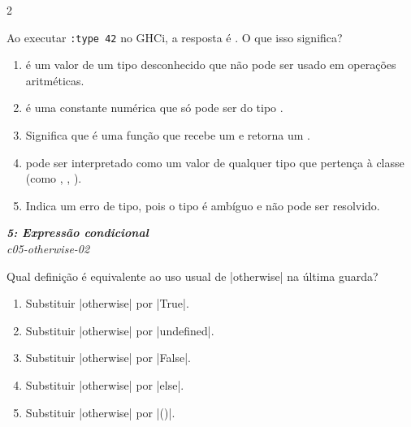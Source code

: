 \documentclass[a4paper,10pt,brazil]{article}
\begin{document}
\begin{multicols}{2}
\begin{flushright}
\end{flushright}
Ao executar \texttt{:type 42} no GHCi, a resposta é . O que isso significa?

\begin{enumerate}
  \item {} é um valor de um tipo desconhecido que não pode ser usado em operações aritméticas.

  \item {} é uma constante numérica que só pode ser do tipo .

  \item Significa que  é uma função que recebe um  e retorna um .

  \item {} pode ser interpretado como um valor de qualquer tipo que pertença à classe  (como , , ).

  \item Indica um erro de tipo, pois o tipo é ambíguo e não pode ser resolvido.


\end{enumerate}

\begin{flushright}
  \footnotesize
  \textit{\textbf{5: Expressão condicional}}\\
  \textit{c05-otherwise-02}\\

\end{flushright}
Qual definição é equivalente ao uso usual de \haskellinline|otherwise| na última guarda?

\begin{enumerate}
  \item Substituir \haskellinline|otherwise| por \haskellinline|True|.

  \item Substituir \haskellinline|otherwise| por \haskellinline|undefined|.

  \item Substituir \haskellinline|otherwise| por \haskellinline|False|.

  \item Substituir \haskellinline|otherwise| por \haskellinline|else|.

  \item Substituir \haskellinline|otherwise| por \haskellinline|()|.



\end{enumerate}
\end{multicols}
\end{document}
